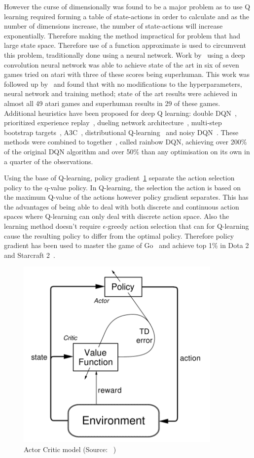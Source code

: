 However the curse of dimensionally was found to be a major problem as to use Q learning required
forming a table of state-actions in order to calculate and as the number of dimensions increase, the number of
state-actions will increase exponentially. Therefore making the method impractical for problem that had large state
space. Therefore use of a function approximate is used to circumvent this problem, traditionally done using a neural
network. Work by~\cite{atari} using a deep convolution neural network was able to achieve state of the art in six of seven
games tried on atari with three of these scores being superhuman. This work was followed up by~\cite{mnih2015humanlevel}
and found that with no modifications to the hyperparameters, neural network and training method; state of the art results were
achieved in almost all 49 atari games and superhuman results in 29 of these games. Additional heuristics have been
proposed for deep Q learning: double DQN~\citep{doubledqn}, prioritized experience replay~\citep{prioritizedexperiencereplay},
dueling network architecture~\citep{duelingdqn}, multi-step bootstrap targets~\citep{multi-step-dqn, Sutton1998},
A3C~\cite{A3C}, distributional Q-learning~\citep{distributional_dqn} and noisy DQN~\citep{noisy_dqn}. These methods were
combined to together~\cite{rainbow}, called rainbow DQN, achieving over 200\% of the original DQN algorithm and over
50\% than any optimisation on its own in a quarter of the observations.

Using the base of Q-learning, policy gradient~\ref{fig:actor-critic-model} separate the action selection policy to the
q-value policy. In Q-learning, the selection the action is based on the maximum Q-value of the actions however policy
gradient separates. This has the advantages of being able to deal with both discrete and continuous action spaces where
Q-learning can only deal with discrete action space. Also the learning method doesn't require $\epsilon$-greedy action
selection that can for Q-learning cause the resulting policy to differ from the optimal policy. Therefore policy
gradient has been used to master the game of Go~\citep{silver2017mastering} and achieve top 1\% in
Dota 2~\citep{OpenAI_dota} and Starcraft 2~\citep{starcraft2}.

\begin{figure}
    \includegraphics[width=10cm]{figures/actor-critic.png}
    \caption{Actor Critic model (Source: ~\cite{Sutton1998})}
    \label{fig:actor-critic-model}
\end{figure}